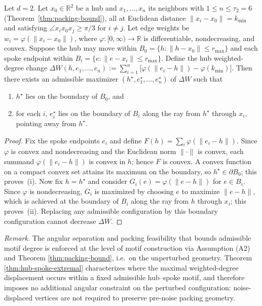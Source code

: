 \documentclass[
  11pt,
  letterpaper]{siamart251216}
\begin{document}
\begin{theorem}\label{thm:hub-spoke-extremal}
Let $d=2$.  Let $x_0 \in \mathbb{R}^2$ be a hub and $x_1,\dots,x_n$ its neighbors with $1 \le n \le \tau_2 = 6$ (Theorem~\ref{thm:packing-bound}), all at Euclidean distance $\|x_i-x_0\|=k_{\min}$ and satisfying $\angle x_i x_0 x_j \ge \pi/3$ for $i\neq j$.
Let edge weights be $w_i=\varphi(\|x_i-x_0\|)$, where $\varphi:[0,\infty)\to\mathbb{R}$ is differentiable, nondecreasing, and convex.
Suppose the hub may move within $B_0=\{h:\|h-x_0\|\le r_{\max}\}$ and each spoke endpoint within
$B_i=\{e:\|e-x_i\|\le r_{\max}\}$.
Define the hub weighted-degree change $\Delta W(h,e_1,\dots,e_n):= \sum_{i=1}^n \bigl[\varphi(\|e_i-h\|)-\varphi(k_{\min})\bigr].$
Then there exists an admissible maximizer $(h^\star,e_1^\star,\dots,e_n^\star)$ of $\Delta W$ such that
\begin{enumerate}
\item[(i)] $h^\star$ lies on the boundary of $B_0$, and
\item[(ii)] for each $i$, $e_i^\star$ lies on the boundary of $B_i$ along the ray from $h^\star$ through $x_i$, pointing away from $h^\star$.
\end{enumerate}
\end{theorem}

\begin{proof}
Fix the spoke endpoints $e_i$ and define $F(h)=\sum_i \varphi(\|e_i-h\|)$.
Since $\varphi$ is convex and nondecreasing and the Euclidean norm $\|\cdot\|$ is convex, each summand $\varphi(\|e_i-h\|)$ is convex in $h$; hence $F$ is convex.
A convex function on a compact convex set attains its maximum on the boundary, so $h^\star\in\partial B_0$; this proves~(i).
Now fix $h=h^\star$ and consider $G_i(e)=\varphi(\|e-h\|)$ for $e\in B_i$.
Since $\varphi$ is nondecreasing, $G_i$ is maximized by choosing $e$ to maximize $\|e-h\|$, which is achieved at the boundary of $B_i$ along the ray from $h$ through $x_i$; this proves~(ii).
Replacing any admissible configuration by this boundary configuration cannot decrease $\Delta W$.
\end{proof}

\emph{Remark.} The angular separation and packing feasibility that
bounds admissible motif degree is enforced at the level of motif
construction via Assumption (A2) and Theorem \ref{thm:packing-bound},
i.e.~on the unperturbed geometry. Theorem \ref{thm:hub-spoke-extremal}
characterizes where the maximal weighted-degree displacement occurs
within a fixed admissible hub--spoke motif, and therefore imposes no
additional angular constraint on the perturbed configuration:
noise-displaced vertices are not required to preserve pre-noise packing
geometry.
\end{document}
